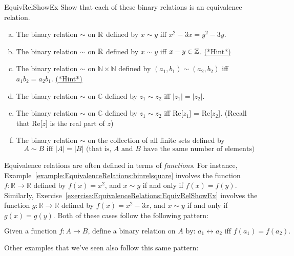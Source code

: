 \begin{exercise}{EquivRelShowEx}
Show that each of these binary relations is an equivalence relation.
\begin{enumerate}[(a)]
\item \label{EquivRelShowEx-x2min3x}
The binary relation $\sim$ on $\mathbb{R}$ defined by $x \sim y$ iff $x^2 - 3x = y^2 - 3y$.
\item \label{EquivRelShowEx-xminyinZ}
The binary relation $\sim$ on $\mathbb{R}$ defined by $x \sim y$ iff $x - y \in \mathbb{Z}$.
\hyperref[sec:EquivalenceRelations:Hints]{(*Hint*)}
\item \label{EquivRelShowEx-ab=ab}
The binary relation $\sim$ on $\mathbb{N} \times \mathbb{N}$ defined by $(a_1,b_1) \sim (a_2,b_2)$ iff $a_1 b_2 = a_2 b_1$.
\hyperref[sec:EquivalenceRelations:Hints]{(*Hint*)}
\item \label{EquivRelComplex1}
The binary relation $\sim$ on $\mathbb{C}$ defined by $z_1 \sim z_2$ iff $|z_1|=|z_2|$.
\item \label{EquivRelComplex2}
The binary relation $\sim$ on $\mathbb{C}$  defined by $z_1 \sim z_2$ iff Re[$z_1$] = Re[$z_2$].  (Recall that Re[$z$] is the real part of $z$)
\item
The binary relation $\sim$ on the collection of all finite sets defined by
\[  A \sim B  \text{ iff } |A|=|B|  \text{  (that is, }A \text{ and } B \text{ have the same number of elements)} \]
\end{enumerate}
\end{exercise}


Equivalence relations are often defined in terms of \emph{functions}.  For instance,  Example~\ref{example:EquivalenceRelations:binrelsquare}  involves the function $f: \mathbb{R} \rightarrow 
\mathbb{R}$ defined by $f(x)=x^2$, and $x \sim y$ if and only if $f(x) = f(y)$.  Similarly, Exercise~\ref{exercise:EquivalenceRelations:EquivRelShowEx} involves the function 
$g: \mathbb{R} \rightarrow 
\mathbb{R}$ defined by $f(x)=x^2-3x$, and $x \sim y$ if and only if $g(x) = g(y)$.
Both of these cases follow the following pattern:

\begin{equation*}
\mbox{Given a function $f: A \rightarrow B$, define a binary relation on $A$ by: $a_1 \rel a_2$ iff $f(a_1) = f(a_2)$.}
\end{equation*}

Other examples that we've seen also follow this same pattern:

